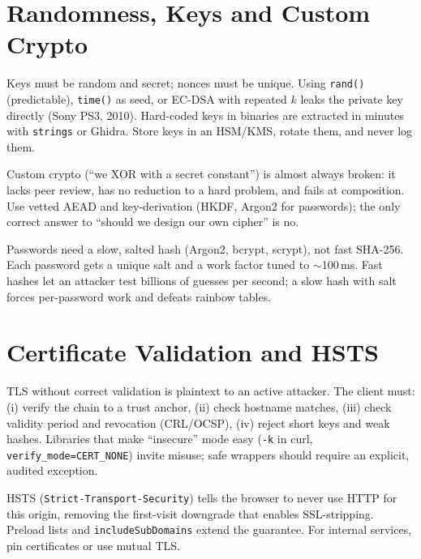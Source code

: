 \section{Randomness, Keys and Custom Crypto}
\label{sec:keys-rand}
Keys must be random and secret; nonces must be unique. Using \texttt{rand()} (predictable), \texttt{time()} as seed, or EC-DSA with repeated $k$ leaks the private key directly (Sony PS3, 2010). Hard-coded keys in binaries are extracted in minutes with \texttt{strings} or Ghidra. Store keys in an HSM/KMS, rotate them, and never log them.

Custom crypto (``we XOR with a secret constant'') is almost always broken: it lacks peer review, has no reduction to a hard problem, and fails at composition. Use vetted AEAD and key-derivation (HKDF, Argon2 for passwords); the only correct answer to ``should we design our own cipher'' is no.

\begin{remark}
Passwords need a slow, salted hash (Argon2, bcrypt, scrypt), not fast SHA-256. Each password gets a unique salt and a work factor tuned to $\sim$100\,ms. Fast hashes let an attacker test billions of guesses per second; a slow hash with salt forces per-password work and defeats rainbow tables.
\end{remark}

\section{Certificate Validation and HSTS}
\label{sec:cert-hsts}
TLS without correct validation is plaintext to an active attacker. The client must: (i) verify the chain to a trust anchor, (ii) check hostname matches, (iii) check validity period and revocation (CRL/OCSP), (iv) reject short keys and weak hashes. Libraries that make ``insecure'' mode easy (\texttt{-k} in curl, \texttt{verify\_mode=CERT\_NONE}) invite misuse; safe wrappers should require an explicit, audited exception.

HSTS (\texttt{Strict-Transport-Security}) tells the browser to never use HTTP for this origin, removing the first-visit downgrade that enables SSL-stripping. Preload lists and \texttt{includeSubDomains} extend the guarantee. For internal services, pin certificates or use mutual TLS.

